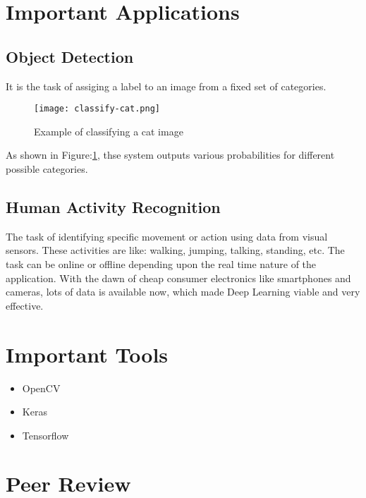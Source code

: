 \documentclass{article}
\begin{document}
	
	\section{Important Applications}
		\subsection{Object Detection}
		It is the task of assiging a label to an image from a fixed set of categories.
		\begin{figure}[H]
			\texttt{[image: classify-cat.png]}
			\caption{Example of classifying a cat image}
			\label{fig:classify-cat}
		\end{figure}
		As shown in Figure:\ref{fig:classify-cat}, thse system outputs various probabilities for different possible categories.
		
		\subsection{Human Activity Recognition}
		The task of identifying specific movement or action using data from visual sensors. These activities are like: walking, jumping, talking, standing, etc. The task can be online or offline depending upon the real time nature of the application. With the dawn of cheap consumer electronics like smartphones and cameras, lots of data is available now, which made Deep Learning viable and very effective.



	\section{Important Tools}
	\begin{itemize}
		\item OpenCV
		\item Keras
		\item Tensorflow
	\end{itemize}
	
	
	\section{Peer Review}
\end{document}
